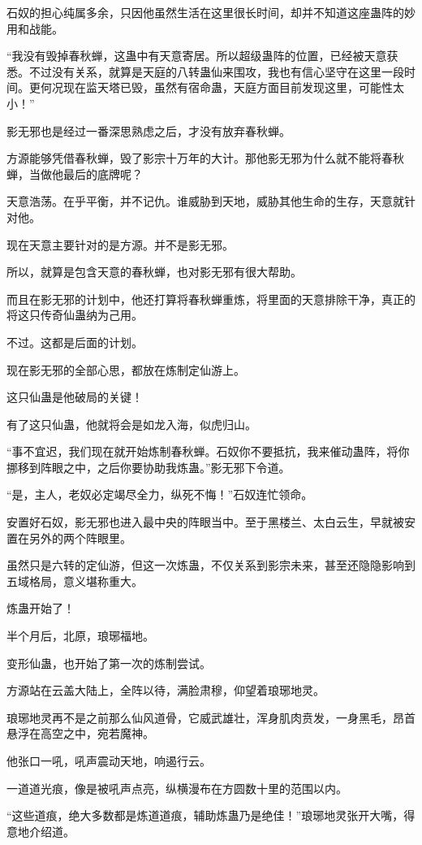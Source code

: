 \begin{this_body}
石奴的担心纯属多余，只因他虽然生活在这里很长时间，却并不知道这座蛊阵的妙用和战能。

“我没有毁掉春秋蝉，这蛊中有天意寄居。所以超级蛊阵的位置，已经被天意获悉。不过没有关系，就算是天庭的八转蛊仙来围攻，我也有信心坚守在这里一段时间。更何况现在监天塔已毁，虽然有宿命蛊，天庭方面目前发现这里，可能性太小！”

影无邪也是经过一番深思熟虑之后，才没有放弃春秋蝉。

方源能够凭借春秋蝉，毁了影宗十万年的大计。那他影无邪为什么就不能将春秋蝉，当做他最后的底牌呢？

天意浩荡。在乎平衡，并不记仇。谁威胁到天地，威胁其他生命的生存，天意就针对他。

现在天意主要针对的是方源。并不是影无邪。

所以，就算是包含天意的春秋蝉，也对影无邪有很大帮助。

而且在影无邪的计划中，他还打算将春秋蝉重炼，将里面的天意排除干净，真正的将这只传奇仙蛊纳为己用。

不过。这都是后面的计划。

现在影无邪的全部心思，都放在炼制定仙游上。

这只仙蛊是他破局的关键！

有了这只仙蛊，他就将会是如龙入海，似虎归山。

“事不宜迟，我们现在就开始炼制春秋蝉。石奴你不要抵抗，我来催动蛊阵，将你挪移到阵眼之中，之后你要协助我炼蛊。”影无邪下令道。

“是，主人，老奴必定竭尽全力，纵死不悔！”石奴连忙领命。

安置好石奴，影无邪也进入最中央的阵眼当中。至于黑楼兰、太白云生，早就被安置在另外的两个阵眼里。

虽然只是六转的定仙游，但这一次炼蛊，不仅关系到影宗未来，甚至还隐隐影响到五域格局，意义堪称重大。

炼蛊开始了！

半个月后，北原，琅琊福地。

变形仙蛊，也开始了第一次的炼制尝试。

方源站在云盖大陆上，全阵以待，满脸肃穆，仰望着琅琊地灵。

琅琊地灵再不是之前那么仙风道骨，它威武雄壮，浑身肌肉贲发，一身黑毛，昂首悬浮在高空之中，宛若魔神。

他张口一吼，吼声震动天地，响遏行云。

一道道光痕，像是被吼声点亮，纵横漫布在方圆数十里的范围以内。

“这些道痕，绝大多数都是炼道道痕，辅助炼蛊乃是绝佳！”琅琊地灵张开大嘴，得意地介绍道。


\end{this_body}
